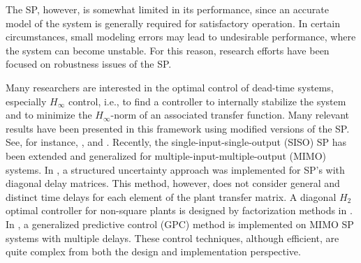 \documentclass[A4, 10pt, conference]{ieeeconf}
\begin{document}
The SP, however, is somewhat limited in its performance, since an accurate model of the system is generally required for satisfactory operation. In certain circumstances, small modeling errors may lead to undesirable performance, where the system can become unstable. For this reason, research efforts have been focused on robustness issues of the SP. 

Many researchers are interested in the optimal control of dead-time
systems, especially $H_{\infty}$ control, i.e., to find a controller to
internally stabilize the system and to minimize the $H_{\infty}$-norm of an associated transfer
function. Many relevant results have been presented in this framework using 
modified versions of the SP. See, for instance, \cite{Mir03}, \cite{MZ00} and \cite{Zho03a}. Recently, the single-input-single-output (SISO) SP has been extended and generalized for multiple-input-multiple-output (MIMO) systems. In \cite{SBP09}, a structured uncertainty approach was implemented for SP's with diagonal delay matrices. This method, however, does not consider general and distinct time delays for each element of the plant transfer matrix. A diagonal $H_2$ optimal controller for non-square plants is designed by factorization methods in \cite{ZL06}. In \cite{NC00}, a generalized predictive control (GPC) method is implemented on MIMO SP systems with multiple delays.   
These control techniques, although efficient, are quite complex from both the design and implementation perspective.
\end{document}
